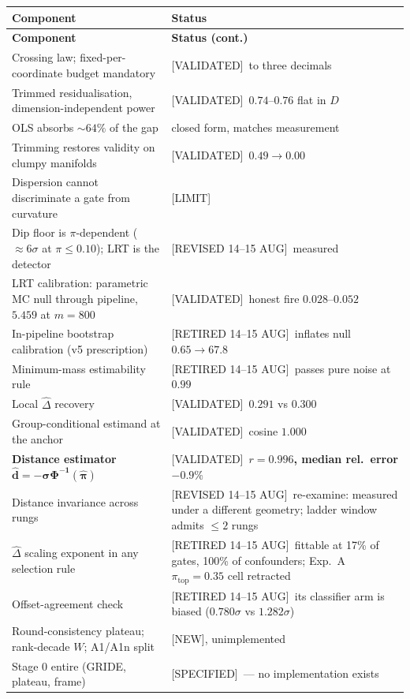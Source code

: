 \documentclass[11pt]{article}
\newcommand{\dhat}{\hat{d}}
\newcommand{\pihat}{\hat{\pi}}
\newcommand{\Dhat}{\hat{\Delta}}
\newcommand{\provtag}[2]{{\footnotesize\sffamily\textcolor{#1}{[#2]}}}
\newcommand{\VALID}{\provtag{okgreen}{VALIDATED}}
\newcommand{\SPEC}{\provtag{specblue}{SPECIFIED}}
\newcommand{\NEWT}{\provtag{newmag}{NEW}}
\newcommand{\LIMIT}{\provtag{limred}{LIMIT}}
\newcommand{\RETIRED}{\provtag{limred}{RETIRED 14--15 AUG}}
\newcommand{\REVI}{\provtag{openamber}{REVISED 14--15 AUG}}
\begin{document}
{\small
\begin{longtable}{@{}p{}p{}@{}}
\toprule
\textbf{\sffamily Component} & \textbf{\sffamily Status}\\
\midrule
\endfirsthead
\toprule
\textbf{\sffamily Component} & \textbf{\sffamily Status (cont.)}\\
\midrule
\endhead
Crossing law; fixed-per-coordinate budget mandatory & \VALID\ to three decimals\\
Trimmed residualisation, dimension-independent power & \VALID\ $0.74$--$0.76$ flat in $D$\\
OLS absorbs ${\sim}64\%$ of the gap & closed form, matches measurement\\
Trimming restores validity on clumpy manifolds & \VALID\ $0.49 \to 0.00$\\
Dispersion cannot discriminate a gate from curvature & \LIMIT\\
Dip floor is $\pi$-dependent (${\approx}6\sigma$ at $\pi \le 0.10$); LRT is the detector
  & \REVI\ measured\\
LRT calibration: parametric MC null through pipeline, $5.459$ at $m = 800$
  & \VALID\ honest fire $0.028$--$0.052$\\
In-pipeline bootstrap calibration (v5 prescription) & \RETIRED\ inflates null $0.65 \to 67.8$\\
Minimum-mass estimability rule & \RETIRED\ passes pure noise at $0.99$\\
Local $\Dhat$ recovery & \VALID\ $0.291$ vs $0.300$\\
Group-conditional estimand at the anchor & \VALID\ cosine $1.000$\\
\textbf{Distance estimator} $\bm{\dhat = -\sigma\Phi^{-1}(\pihat)}$
  & \VALID\ \textbf{$r = 0.996$, median rel.\ error $-0.9\%$}\\
Distance invariance across rungs & \REVI\ re-examine: measured under a different geometry;
  ladder window admits $\le 2$ rungs\\
$\Dhat$ scaling exponent in any selection rule & \RETIRED\ fittable at 17\% of gates,
  100\% of confounders; Exp.~A $\pi_{\mathrm{top}}{=}0.35$ cell retracted\\
Offset-agreement check & \RETIRED\ its classifier arm is biased ($0.780\sigma$ vs
  $1.282\sigma$)\\
Round-consistency plateau; rank-decade $W$; A1/A1n split & \NEWT, unimplemented\\
Stage 0 entire (GRIDE, plateau, frame) & \SPEC\ --- no implementation exists\\

\end{longtable}}
\end{document}
